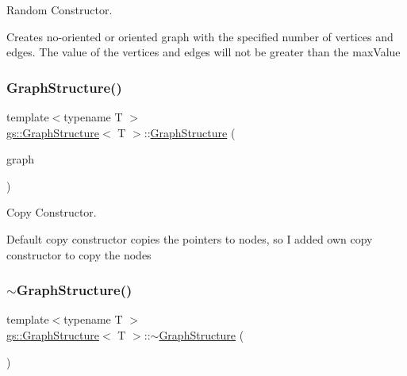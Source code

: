 Random Constructor. 

Creates no-\/oriented or oriented graph with the specified number of vertices and edges. The value of the vertices and edges will not be greater than the max\+Value \mbox{\label{classgs_1_1_graph_structure_a30f102d272103f65b86945164bd99e0e}} 
\subsubsection{\texorpdfstring{Graph\+Structure()}{GraphStructure()}\hspace{0.1cm}{\footnotesize\ttfamily [4/4]}}
{\footnotesize\ttfamily template$<$typename T $>$ \\
\mbox{\hyperlink{classgs_1_1_graph_structure}{gs\+::\+Graph\+Structure}}$<$ T $>$\+::\mbox{\hyperlink{classgs_1_1_graph_structure}{Graph\+Structure}} (\begin{DoxyParamCaption}\item[{const \mbox{\hyperlink{classgs_1_1_graph_structure}{Graph\+Structure}}$<$ T $>$ \&}]{graph }\end{DoxyParamCaption})}



Copy Constructor. 

Default copy constructor copies the pointers to nodes, so I added own copy constructor to copy the nodes \mbox{\label{classgs_1_1_graph_structure_aadb408a61239261f483de8d603263475}} 
\subsubsection{\texorpdfstring{$\sim$\+Graph\+Structure()}{~GraphStructure()}}
{\footnotesize\ttfamily template$<$typename T $>$ \\
\mbox{\hyperlink{classgs_1_1_graph_structure}{gs\+::\+Graph\+Structure}}$<$ T $>$\+::$\sim$\mbox{\hyperlink{classgs_1_1_graph_structure}{Graph\+Structure}} (\begin{DoxyParamCaption}{ }\end{DoxyParamCaption})}



